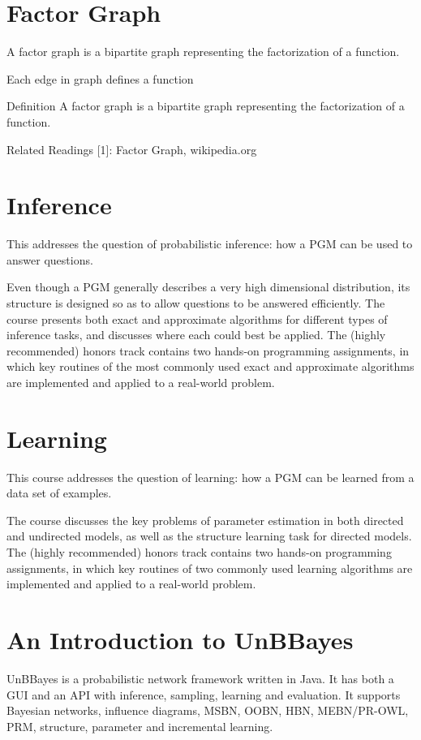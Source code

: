 \section{Factor Graph}

A factor graph is a bipartite graph representing the factorization of a function.

Each edge in graph defines a function

Definition
A factor graph is a bipartite graph representing the factorization of a function.

Related Readings
[1]: Factor Graph, wikipedia.org

\section{Inference}

This addresses the question of probabilistic inference: how a PGM can be used to answer questions.

Even though a PGM generally describes a very high dimensional distribution, its structure is designed so as to allow questions to be answered efficiently. The course presents both exact and approximate algorithms for different types of inference tasks, and discusses where each could best be applied. The (highly recommended) honors track contains two hands-on programming assignments, in which key routines of the most commonly used exact and approximate algorithms are implemented and applied to a real-world problem.

\section{Learning}

This course addresses the question of learning: how a PGM can be learned from a data set of examples.

The course discusses the key problems of parameter estimation in both directed and undirected models, as well as the structure learning task for directed models. The (highly recommended) honors track contains two hands-on programming assignments, in which key routines of two commonly used learning algorithms are implemented and applied to a real-world problem.

\section{An Introduction to UnBBayes}

UnBBayes is a probabilistic network framework written in Java. It has both a GUI and an API with inference, sampling, learning and evaluation. It supports Bayesian networks, influence diagrams, MSBN, OOBN, HBN, MEBN/PR-OWL, PRM, structure, parameter and incremental learning.


